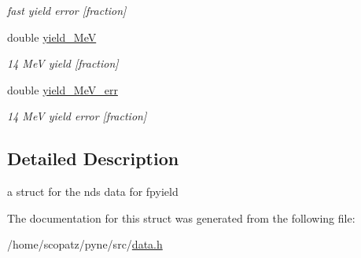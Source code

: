 \begin{DoxyCompactItemize}
\begin{DoxyCompactList}\small\item\em fast yield error \mbox{[}fraction\mbox{]} \end{DoxyCompactList}\item 
\hypertarget{structpyne_1_1ndsfpysub_afb3737be03fedddc6f54fa3a0e59f0e8}{double \hyperlink{structpyne_1_1ndsfpysub_afb3737be03fedddc6f54fa3a0e59f0e8}{yield\-\_\-Me\-V}}\label{structpyne_1_1ndsfpysub_afb3737be03fedddc6f54fa3a0e59f0e8}

\begin{DoxyCompactList}\small\item\em 14 Me\-V yield \mbox{[}fraction\mbox{]} \end{DoxyCompactList}\item 
\hypertarget{structpyne_1_1ndsfpysub_a7bc2487245689a3f6a095f2254e66e99}{double \hyperlink{structpyne_1_1ndsfpysub_a7bc2487245689a3f6a095f2254e66e99}{yield\-\_\-Me\-V\-\_\-err}}\label{structpyne_1_1ndsfpysub_a7bc2487245689a3f6a095f2254e66e99}

\begin{DoxyCompactList}\small\item\em 14 Me\-V yield error \mbox{[}fraction\mbox{]} \end{DoxyCompactList}\end{DoxyCompactItemize}


\subsection{Detailed Description}
a struct for the nds data for fpyield 

The documentation for this struct was generated from the following file\-:\begin{DoxyCompactItemize}
\item 
/home/scopatz/pyne/src/\hyperlink{data_8h}{data.\-h}\end{DoxyCompactItemize}
